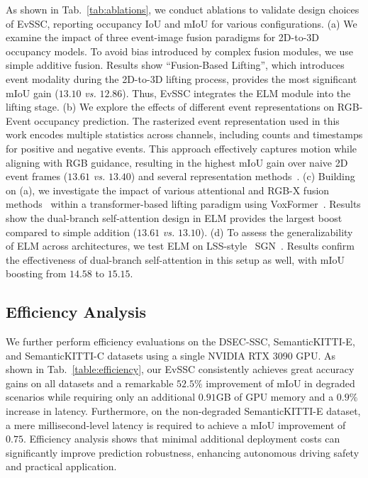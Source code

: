 %
As shown in Tab.~\ref{tab:ablations}, we conduct ablations to validate design choices of EvSSC, reporting occupancy IoU and mIoU for various configurations.
(a) We examine the impact of three event-image fusion paradigms for 2D-to-3D occupancy models. 
To avoid bias introduced by complex fusion modules, we use simple additive fusion. 
Results show ``Fusion-Based Lifting'', which introduces event modality during the 2D-to-3D lifting process, provides the most significant mIoU gain ($13.10$ \textit{vs.} $12.86$).
Thus, EvSSC integrates the ELM module into the lifting stage.
(b) We explore the effects of different event representations on RGB-Event occupancy prediction.
The rasterized event representation used in this work encodes multiple statistics across channels, including counts and timestamps for positive and negative events. 
This approach effectively captures motion while aligning with RGB guidance, resulting in the highest mIoU gain over naive 2D event frames ($13.61$ \textit{vs.} $13.40$) and several representation methods~\cite{delbruck2008frame,vonmarcard2018recovering}.
(c) Building on (a), we investigate the impact of various attentional and RGB-X fusion methods~\cite{woo2018cbam,zhang2023cmx,sun2022event_deblurring} within a transformer-based lifting paradigm using VoxFormer~\cite{li2023voxformer}. 
Results show the dual-branch self-attention design in ELM provides the largest boost compared to simple addition ($13.61$ \textit{vs.} $13.10$).
(d) To assess the generalizability of ELM across architectures, we test ELM on LSS-style~\cite{philion2020lift} SGN~\cite{mei2024sgn}. 
Results confirm the effectiveness of dual-branch self-attention in this setup as well, with mIoU boosting from $14.58$ to $15.15$.

\subsection{Efficiency Analysis}
We further perform efficiency evaluations on the DSEC-SSC, SemanticKITTI-E, and SemanticKITTI-C datasets using a single NVIDIA RTX 3090 GPU. 
As shown in Tab.~\ref{table:efficiency}, our EvSSC consistently achieves great accuracy gains on all datasets and a remarkable $52.5\%$ improvement of mIoU in degraded scenarios while requiring only an additional $0.91$GB of GPU memory and a $0.9\%$ increase in latency.
Furthermore, on the non-degraded SemanticKITTI-E dataset, a mere millisecond-level latency is required to achieve a mIoU improvement of $0.75$. Efficiency analysis shows that minimal additional deployment costs can significantly improve prediction robustness, enhancing autonomous driving safety and practical application.


